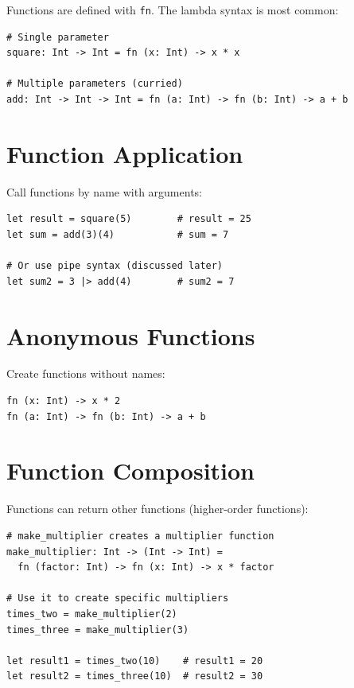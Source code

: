 \documentclass[11pt,twoside,openright]{book}
\begin{document}
Functions are defined with \texttt{fn}. The lambda syntax is most common:

\begin{lstlisting}[language=ConstructLang]
# Single parameter
square: Int -> Int = fn (x: Int) -> x * x

# Multiple parameters (curried)
add: Int -> Int -> Int = fn (a: Int) -> fn (b: Int) -> a + b
\end{lstlisting}

\section{Function Application}

Call functions by name with arguments:

\begin{lstlisting}[language=ConstructLang]
let result = square(5)        # result = 25
let sum = add(3)(4)           # sum = 7

# Or use pipe syntax (discussed later)
let sum2 = 3 |> add(4)        # sum2 = 7
\end{lstlisting}

\section{Anonymous Functions}

Create functions without names:

\begin{lstlisting}[language=ConstructLang]
fn (x: Int) -> x * 2
fn (a: Int) -> fn (b: Int) -> a + b
\end{lstlisting}

\section{Function Composition}

Functions can return other functions (higher-order functions):

\begin{lstlisting}[language=ConstructLang]
# make_multiplier creates a multiplier function
make_multiplier: Int -> (Int -> Int) =
  fn (factor: Int) -> fn (x: Int) -> x * factor

# Use it to create specific multipliers
times_two = make_multiplier(2)
times_three = make_multiplier(3)

let result1 = times_two(10)    # result1 = 20
let result2 = times_three(10)  # result2 = 30
\end{lstlisting}
\end{document}
